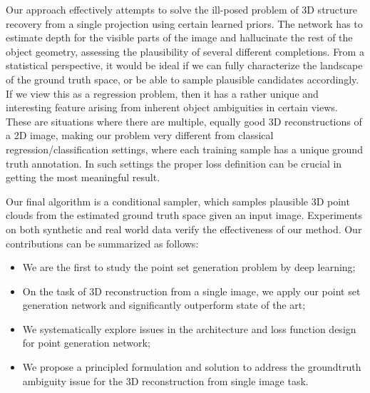 \documentclass[10pt,twocolumn,letterpaper]{article}
\newcommand{\denselist}{\itemsep 0pt\parsep=0pt\partopsep 0pt\vspace{-2pt}}
\newcommand{\bitem}{\begin{itemize}\denselist}
\newcommand{\eitem}{\end{itemize}}
\begin{document}
Our approach effectively attempts to solve the ill-posed problem of 3D structure recovery from a single projection using certain learned priors. The network has to estimate depth for the visible parts of the image and hallucinate the rest of the object geometry, assessing the plausibility of several different completions. From a statistical perspective, it would be ideal if we can fully characterize the landscape of the ground truth space, or be able to sample plausible candidates accordingly. If we view this as a regression problem, then it has a rather unique and interesting feature arising from inherent object ambiguities in certain views. These are situations where there are multiple, equally good 3D reconstructions of a 2D image, making our problem very different from classical regression/classification settings, where each training sample has a unique ground truth annotation. In such settings the proper loss definition can be crucial in getting the most meaningful result.

Our final algorithm is a conditional sampler, which samples plausible 3D point clouds from the estimated ground truth space given an input image. Experiments on both synthetic and real world data verify the effectiveness of our method. %
Our contributions can be summarized as follows:
\bitem\item We are the first to study the point set generation problem by deep learning; 
  \item On the task of 3D reconstruction from a single image, we apply our point set generation network and significantly outperform state of the art;
  \item We systematically explore issues in the architecture and loss function design for point generation network;
  \item We propose a principled formulation and solution to address the groundtruth ambiguity issue for the 3D reconstruction from single image task.
\eitem
\end{document}
